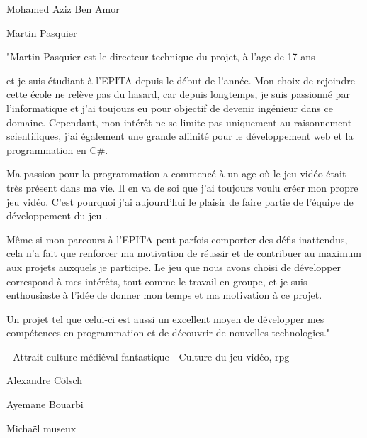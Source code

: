 Mohamed Aziz Ben Amor




Martin Pasquier

    
    "Martin Pasquier est le directeur technique du projet, à l'age de 17 ans 
    
    et je suis étudiant à l'EPITA depuis le début de l'année. 
    Mon choix de rejoindre cette école ne relève pas du hasard, car depuis longtemps, je suis passionné par l'informatique et j'ai toujours eu pour objectif de devenir ingénieur dans ce domaine. 
    Cependant, mon intérêt ne se limite pas uniquement au raisonnement scientifiques, j'ai également une grande affinité pour le développement web et la programmation en C\#. 
    
    Ma passion pour la programmation a commencé à un age où le jeu vidéo était très présent dans ma vie. Il en va de soi que j'ai toujours voulu créer mon propre jeu vidéo.
    C'est pourquoi j'ai aujourd'hui le plaisir de faire partie de l'équipe de développement du jeu \gameName.
    
    Même si mon parcours à l'EPITA peut parfois comporter des défis inattendus, cela n'a fait que renforcer ma motivation de réussir et de contribuer au maximum aux projets auxquels je participe.
    Le jeu que nous avons choisi de développer correspond à mes intérêts, tout comme le travail en groupe, et je suis enthousiaste à l'idée de donner mon temps et ma motivation à ce projet.
    
    Un projet tel que celui-ci est aussi un excellent moyen de développer mes compétences en programmation et de découvrir de nouvelles technologies."

    - Attrait culture médiéval fantastique
    - Culture du jeu vidéo, rpg



Alexandre Cölsch




Ayemane Bouarbi




Michaël museux




